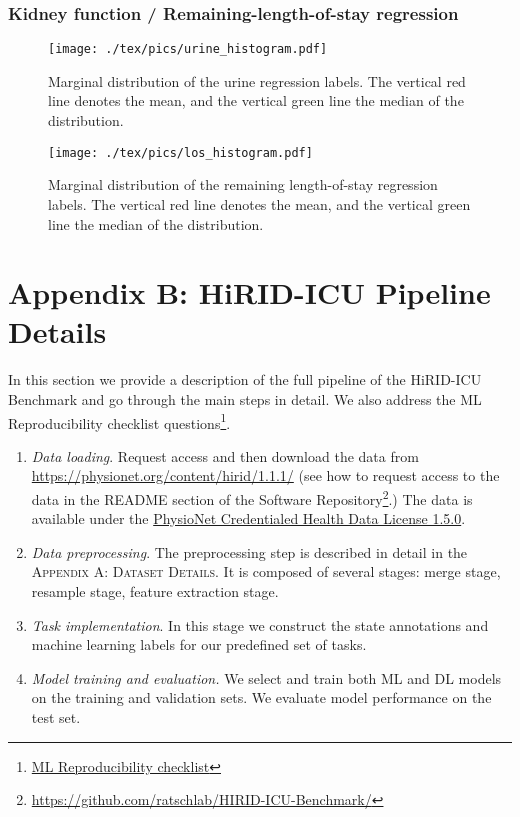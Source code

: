 \documentclass{article}
\begin{document}
\subsubsection*{Kidney function / Remaining-length-of-stay regression} \label{appsec:appendix-regressive-statistics}



\begin{figure}[h!]
\centering
\texttt{[image: ./tex/pics/urine\_histogram.pdf]}
\caption{Marginal distribution of the urine regression labels. The vertical red line denotes the mean, and the vertical
green line the median of the distribution.}
\label{fig:appendix-urine-label-dist}
\end{figure}
\FloatBarrier

\begin{figure}[h!]
\centering
\texttt{[image: ./tex/pics/los\_histogram.pdf]}
\caption{Marginal distribution of the remaining length-of-stay regression labels. The vertical red line denotes the mean,
and the vertical green line the median of the distribution.}
\label{fig:appendix-los-label-dist}
\end{figure}
\FloatBarrier
 











\section{Appendix B: HiRID-ICU Pipeline Details}

In this section we provide a description of the full pipeline of the HiRID-ICU Benchmark and go through the main steps in detail. We also address the ML Reproducibility checklist questions\footnote{\href{https://arxiv.org/pdf/2003.12206.pdf}{ML Reproducibility checklist}}. 
\begin{enumerate}\addtocounter{enumi}{-1}
    \item \textit{Data loading}. Request access and then download the data from \url{https://physionet.org/content/hirid/1.1.1/} (see how to request access to the data in the README section of the Software Repository\footnote{\url{https://github.com/ratschlab/HIRID-ICU-Benchmark/}}.) The data is available under the \href{https://physionet.org/content/hirid/view-license/1.1.1/}{PhysioNet Credentialed Health Data License 1.5.0}.
    \item \textit{Data preprocessing}. The preprocessing step is described in detail in the \textsc{Appendix A: Dataset Details}. It is composed of several stages: merge stage, resample stage, feature extraction stage.
    \item \textit{Task implementation}. In this stage we construct the state annotations and machine learning labels for our predefined set of tasks.
    \item \textit{Model training and evaluation.} We select and train both ML and DL models on the training and validation sets. We evaluate model performance on the test set.
\end{enumerate}
\end{document}
